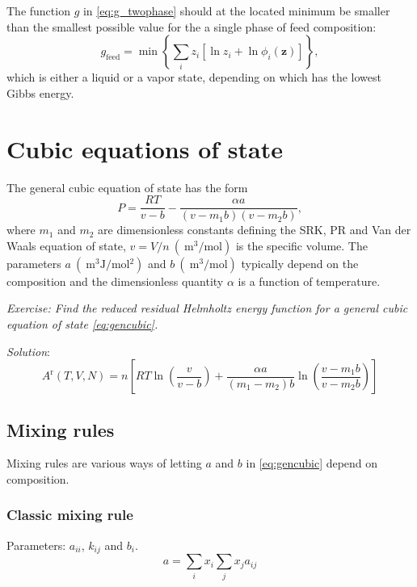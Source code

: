 \documentclass[english]{../thermomemo/thermomemo}
\newcommand*{\vektor}[1]{\boldsymbol{#1}}%
\begin{document}
The function $g$ in \eqref{eq:g_twophase} should at the located minimum be smaller than the smallest possible value 
for the a single phase of feed composition:
\begin{equation}
  g_\text{feed} = \min\left\{ \sum_i  z_i \left[ \ln z_i + \ln \phi_i(\vektor{z}) \right]   \right\},
  \label{}
\end{equation}
which is either a liquid or a vapor state, depending on which has the lowest Gibbs energy.


\section{Cubic equations of state}
The general cubic equation of state has the form
\begin{equation}
P = \frac{RT}{v -b}- \frac{\alpha a}{(v-m_1 b)(v-m_2 b)},
\label{eq:gencubic}
\end{equation}
where $m_1$ and $m_2$ are dimensionless constants defining the SRK, PR and Van der
Waals equation of state, $v=V/n~(\SI{}{\meter^3\per\mol})$ is the specific volume. The
parameters $a~(\SI{}{\meter^3\joule\per \mol^2})$ and $b~(\SI{}{\meter^3\per\mol})$ typically 
depend on the composition and the dimensionless quantity 
$\alpha$ is a function of temperature. 



\begin{shaded}
  \noindent
\textit{Exercise: Find the reduced residual Helmholtz energy function for a general
cubic equation of state \eqref{eq:gencubic}.}

\noindent
\textit{Solution}:
\begin{equation}
  A^\text{r}(T,V,N) = n \left[ RT\ln \left( \frac{v}{v-b} \right) + 
  \frac{\alpha a}{\left( m_1-m_2 \right)b} \ln\left( \frac{v-m_1 b}{v-m_2 b} \right) \right]
  \label{}
\end{equation}

\end{shaded}

\subsection{Mixing rules}
Mixing rules are various ways of letting $a$ and $b$ in \eqref{eq:gencubic} 
depend on composition. 

\subsubsection{Classic mixing rule}
Parameters: $a_{ii}$, $k_{ij}$ and $b_i$.
\begin{equation}
  a = \sum_i x_i \sum_j x_j a_{ij}
  \label{}
\end{equation}
\end{document}
